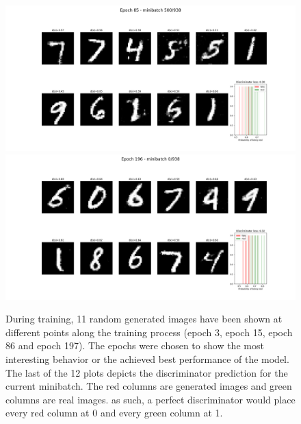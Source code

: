 \documentclass[12pt, fleqn, titlepage]{article}
\begin{document}
\begin{figure}[H]
	\includegraphics[width=\linewidth]{imgs/MNIST_GAN_mse_result_epoch_84_minibatch_500}
	\hfill
	\includegraphics[width=\linewidth]{imgs/MNIST_GAN_mse_result_epoch_195_minibatch_0}
	\caption{During training, 11 random generated images have been shown at different points along the training process (epoch 3, epoch 15, epoch 86 and epoch 197). The epochs were chosen to show the most interesting behavior or the achieved best performance of the model. The last of the 12 plots depicts the discriminator prediction for the current minibatch. The red columns are generated images and green columns are real images. as such, a perfect discriminator would place every red column at 0 and every green column at 1.}
		\label{fig:training_progress_mse}
\end{figure}
\end{document}

